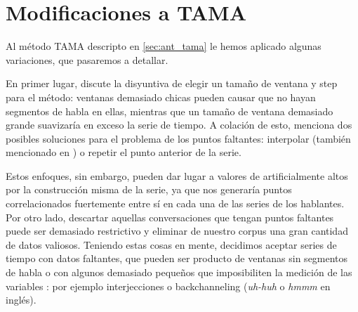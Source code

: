 \section{Modificaciones a TAMA}
\label{sec:tama_modifications}
Al método TAMA descripto en \ref{sec:ant_tama} le hemos aplicado algunas variaciones, que pasaremos a detallar.

En primer lugar, \cite{KOU2008.2} discute la disyuntiva de elegir un tamaño de ventana y step para el método: ventanas demasiado chicas pueden causar que no hayan segmentos de habla en ellas, mientras que un tamaño de ventana demasiado grande suavizaría en exceso la serie de tiempo. A colación de esto, menciona dos posibles soluciones para el problema de los puntos faltantes: interpolar (también mencionado en \cite{DEL2013}) o repetir el punto anterior de la serie.

Estos enfoques, sin embargo, pueden dar lugar a valores de \entrainment artificialmente altos por la construcción misma de la serie, ya que nos generaría puntos correlacionados fuertemente entre sí en cada una de las series de los hablantes. Por otro lado, descartar aquellas conversaciones que tengan puntos faltantes puede ser demasiado restrictivo y eliminar de nuestro corpus una gran cantidad de datos valiosos. Teniendo estas cosas en mente, decidimos aceptar series de tiempo con datos faltantes, que pueden ser producto de ventanas sin segmentos de habla o con algunos demasiado pequeños que imposibiliten la medición de las variables \ap: por ejemplo interjecciones o backchanneling (\emph{uh-huh} o \emph{hmmm} en inglés).


